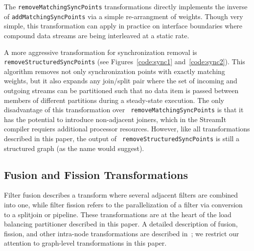 The {\tt removeMatchingSyncPoints} transformations directly implements
the inverse of {\tt addMatchingSyncPoints} via a simple re-arrangment
of weights.  Though very simple, this transformation can apply in
practice on interface boundaries where compound data streams are being
interleaved at a static rate.

A more aggressive transformation for synchronization removal is {\tt
removeStructuredSyncPoints} (see Figures~\ref{code:sync1}
and~\ref{code:sync2}).  This algorithm removes not only
synchronization points with exactly matching weights, but it also
expands any join/split pair where the set of incoming and outgoing
streams can be partitioned such that no data item is passed between
members of different partitions during a steady-state execution.  The
only disadvantage of this transformation over {\tt
removeMatchingSyncPoints} is that it has the potential to introduce
non-adjacent joiners, which in the StreamIt compiler requiers
additional processor resources.  However, like all transformations
described in this paper, the output of {\tt
removeStructuredSyncPoints} is still a structured graph (as the name
would suggest).

\subsection{Fusion and Fission Transformations}

Filter fusion describes a transform where several adjacent filters are
combined into one, while filter fission refers to the parallelization
of a filter via conversion to a splitjoin or pipeline.  These
transformations are at the heart of the load balancing partitioner
described in this paper.  A detailed description of fusion, fission,
and other intra-node transformations are described
in~\cite{streamit-asplos}; we restrict our attention to graph-level
transformations in this paper.
